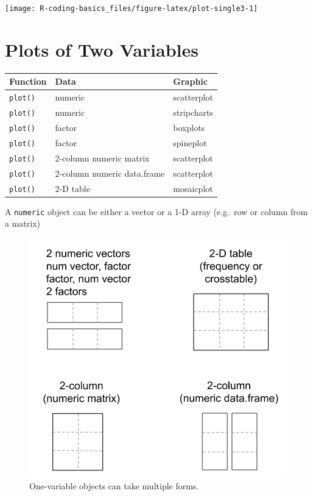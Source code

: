 \documentclass[
]{book}
\begin{document}
\begin{center}\texttt{[image: R-coding-basics\_files/figure-latex/plot-single3-1]} \end{center}

\hypertarget{plots-of-two-variables}{%
\section{Plots of Two Variables}\label{plots-of-two-variables}}

\begin{longtable}[]{@{}lll@{}}
\toprule()
Function & Data & Graphic \\
\midrule()
\endhead
\texttt{plot()} & numeric & scatterplot \\
\texttt{plot()} & numeric & stripcharts \\
\texttt{plot()} & factor & boxplots \\
\texttt{plot()} & factor & spineplot \\
\texttt{plot()} & 2-column numeric matrix & scatterplot \\
\texttt{plot()} & 2-column numeric data.frame & scatterplot \\
\texttt{plot()} & 2-D table & mosaicplot \\
\bottomrule()
\end{longtable}

A \texttt{numeric} object can be either a vector or a 1-D array (e.g.~row or column
from a matrix)

\begin{figure}

{\centering \includegraphics[width=0.6\linewidth]{images/plots/two_variable_objs} 

}

\caption{One-variable objects can take multiple forms.}\label{fig:unnamed-chunk-213}
\end{figure}
\end{document}
